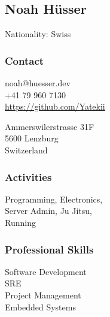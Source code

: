 \begin{facts}
    \section{Noah Hüsser}
    Nationality: Swiss\\
    \sectionsep
    
    \subsubsection{Contact}
    noah@huesser.dev\\
    +41 79 960 7130\\
    \href{https://github.com/Yatekii}{https://github.com/Yatekii}\par
    \vspace{\baselineskip}
    Ammerswilerstrasse 31F\\
    5600 Lenzburg\\
    Switzerland
    \sectionsep
    
    \subsubsection{Activities}
    Programming, Electronics,\\
    Server Admin, Ju Jitsu, \\
    Running
    \sectionsep
    
    \subsubsection{Professional Skills}
    Software Development\\
    SRE\\
    Project Management\\
    Embedded Systems
    \sectionsep
    

\end{facts}
